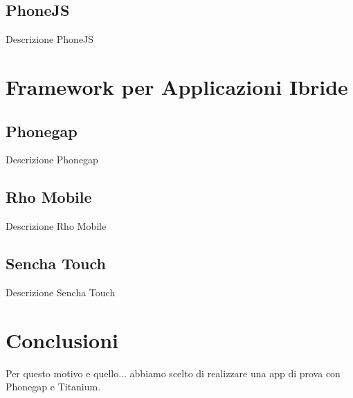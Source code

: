 		\subsection{PhoneJS}
			Descrizione PhoneJS

			
	\section{Framework per Applicazioni Ibride}
	\label{sec:frameworkhybrid}
		\subsection{Phonegap}
			Descrizione Phonegap

		\subsection{Rho Mobile}
			Descrizione Rho Mobile

		\subsection{Sencha Touch}
			Descrizione Sencha Touch
	
	\section{Conclusioni}
		Per questo motivo e quello... abbiamo scelto di realizzare una app di 
		prova con Phonegap e Titanium.
